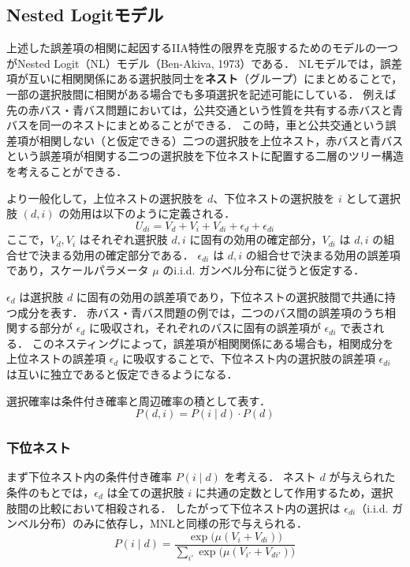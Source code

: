\subsection{Nested Logitモデル}\label{ssec:nested_logit}
上述した誤差項の相関に起因するIIA特性の限界を克服するためのモデルの一つがNested Logit（NL）モデル（Ben-Akiva, 1973）である．
NLモデルでは，誤差項が互いに相関関係にある選択肢同士を\textbf{ネスト}（グループ）にまとめることで，一部の選択肢間に相関がある場合でも多項選択を記述可能にしている．
例えば先の赤バス・青バス問題においては，公共交通という性質を共有する赤バスと青バスを同一のネストにまとめることができる．
この時，車と公共交通という誤差項が相関しない（と仮定できる）二つの選択肢を上位ネスト，赤バスと青バスという誤差項が相関する二つの選択肢を下位ネストに配置する二層のツリー構造を考えることができる．

より一般化して，上位ネストの選択肢を $d$、下位ネストの選択肢を $i$ として選択肢 $(d,i)$ の効用は以下のように定義される．
\begin{equation}
  U_{di} = V_d + V_i + V_{di} + \epsilon_d + \epsilon_{di}
\end{equation}
ここで，$V_d, V_i$ はそれぞれ選択肢 $d, i$ に固有の効用の確定部分，$V_{di}$ は $d, i$ の組合せで決まる効用の確定部分である．
$\epsilon_{di}$ は $d, i$ の組合せで決まる効用の誤差項であり，スケールパラメータ $\mu$ のi.i.d. ガンベル分布に従うと仮定する．

$\epsilon_d$ は選択肢 $d$ に固有の効用の誤差項であり，下位ネストの選択肢間で共通に持つ成分を表す．
赤バス・青バス問題の例では，二つのバス間の誤差項のうち相関する部分が $\epsilon_d$ に吸収され，それぞれのバスに固有の誤差項が $\epsilon_{di}$ で表される．
このネスティングによって，誤差項が相関関係にある場合も，相関成分を上位ネストの誤差項 $\epsilon_d$ に吸収することで、下位ネスト内の選択肢の誤差項 $\epsilon_{di}$ は互いに独立であると仮定できるようになる．

選択確率は条件付き確率と周辺確率の積として表す．
\begin{equation}
  P(d,i) = P(i \mid d) \cdot P(d)
\end{equation}

\subsubsection{下位ネスト}
まず下位ネスト内の条件付き確率 $P(i \mid d)$ を考える．
ネスト $d$ が与えられた条件のもとでは，$\epsilon_d$ は全ての選択肢 $i$ に共通の定数として作用するため，選択肢間の比較において相殺される．
したがって下位ネスト内の選択は $\epsilon_{di}$（i.i.d. ガンベル分布）のみに依存し，MNLと同様の形で与えられる．
\begin{equation}\label{eq:nl-cond}
  P(i \mid d) = \frac{\exp\bigl(\mu (V_i + V_{di})\bigr)}{\displaystyle\sum_{i'} \exp\bigl(\mu (V_{i'} + V_{di'})\bigr)}
\end{equation}

